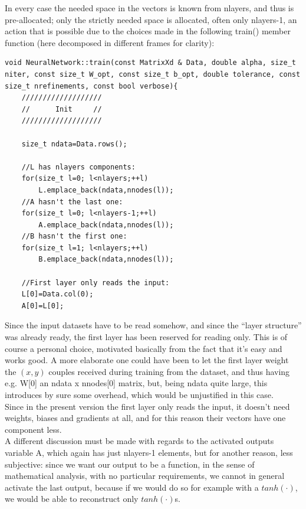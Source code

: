 \documentclass[12pt, a4paper]{report}
\theoremstyle{definition}
\begin{document}
In every case the needed space in the vectors is known from {\ttfamily nlayers}, and thus is pre-allocated; only the strictly needed space is allocated, often only {\ttfamily nlayers-1}, an action that is possible due to the choices made in the following {\ttfamily train()} member function (here decomposed in different frames for clarity):
\begin{lstlisting}[frame=single, showstringspaces=false]
void NeuralNetwork::train(const MatrixXd & Data, double alpha, size_t niter, const size_t W_opt, const size_t b_opt, double tolerance, const size_t nrefinements, const bool verbose){                     
	///////////////////
	//      Init     //
	///////////////////

	size_t ndata=Data.rows();

	//L has nlayers components:
	for(size_t l=0; l<nlayers;++l)
		L.emplace_back(ndata,nnodes(l));
	//A hasn't the last one:
	for(size_t l=0; l<nlayers-1;++l)
		A.emplace_back(ndata,nnodes(l));
	//B hasn't the first one:
	for(size_t l=1; l<nlayers;++l)
		B.emplace_back(ndata,nnodes(l));

	//First layer only reads the input:
	L[0]=Data.col(0); 
	A[0]=L[0];	
\end{lstlisting}
Since the input datasets have to be read somehow, and since the ``layer structure'' was already ready, the first layer has been reserved for reading only. This is of course a personal choice, motivated basically from the fact that it's easy and works good. A more elaborate one could have been to let the first layer weight the $(x,y)$ couples received during training from the dataset, and thus having e.g. {\ttfamily W[0]} an {\ttfamily ndata x nnodes[0]} matrix, but, being {\ttfamily ndata} quite large, this introduces by sure some overhead, which would be unjustified in this case.\\
Since in the present version the first layer only reads the input, it doesn't need weights, biases and gradients at all, and for this reason their vectors have one component less.\\
A different discussion must be made with regards to the activated outputs variable {\ttfamily A}, which again has just {\ttfamily nlayers-1} elements, but for another reason, less subjective: since we want our output to be a function, in the sense of mathematical analysis, with no particular requirements, we cannot in general activate the last output, because if we would do so for example with a $tanh(\cdot)$, we would be able to reconstruct only $tanh(\cdot)$s.\\
\end{document}
